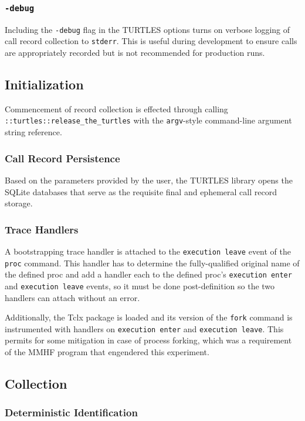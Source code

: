 \documentclass{article}[letter,10pt]
\begin{document}
{{    \subsubsection{\texttt{-debug}}{
      Including the \texttt{-debug} flag in the TURTLES options turns on verbose logging
      of call record collection to \texttt{stderr}. This is useful during development to
      ensure calls are appropriately recorded but is not recommended for production runs.
    }
  }

  \subsection{Initialization}{
    Commencement of record collection is effected through calling \texttt{::turtles::release\_the\_turtles}
    with the \texttt{argv}-style command-line argument string reference.

    \subsubsection{Call Record Persistence}{
      Based on the parameters provided by the user, the TURTLES library opens the SQLite databases that
      serve as the requisite final and ephemeral call record storage.
    }
    \subsubsection{Trace Handlers}{
      A bootstrapping trace handler is attached to the \texttt{execution leave} event of the \texttt{proc} command.
      This handler has to determine the fully-qualified original name of the defined proc and
      add a handler each to the defined proc's \texttt{execution enter} and \texttt{execution leave} events,
      so it must be done post-definition so the two handlers can attach without an error.

      Additionally, the Tclx package is loaded and its version of the \texttt{fork} command is instrumented
      with handlers on \texttt{execution enter} and \texttt{execution leave}. This permits for
      some mitigation in case of process forking, which was a requirement of the MMHF program that
      engendered this experiment.
    }
  }

  \subsection{Collection}{
    \subsubsection{Deterministic Identification}{
}}}
\end{document}
